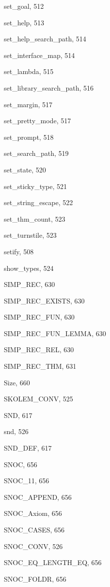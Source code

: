 \begin{theindex}
  \item {\ptt set\_goal}, 512
  \item {\ptt set\_help}, 513
  \item {\ptt set\_help\_search\_path}, 514
  \item {\ptt set\_interface\_map}, 514
  \item {\ptt set\_lambda}, 515
  \item {\ptt set\_library\_search\_path}, 516
  \item {\ptt set\_margin}, 517
  \item {\ptt set\_pretty\_mode}, 517
  \item {\ptt set\_prompt}, 518
  \item {\ptt set\_search\_path}, 519
  \item {\ptt set\_state}, 520
  \item {\ptt set\_sticky\_type}, 521
  \item {\ptt set\_string\_escape}, 522
  \item {\ptt set\_thm\_count}, 523
  \item {\ptt set\_turnstile}, 523
  \item {\ptt setify}, 508
  \item {\ptt show\_types}, 524
  \item {\ptt SIMP\_REC}, 630
  \item {\ptt SIMP\_REC\_EXISTS}, 630
  \item {\ptt SIMP\_REC\_FUN}, 630
  \item {\ptt SIMP\_REC\_FUN\_LEMMA}, 630
  \item {\ptt SIMP\_REC\_REL}, 630
  \item {\ptt SIMP\_REC\_THM}, 631
  \item {\ptt Size}, 660
  \item {\ptt SKOLEM\_CONV}, 525
  \item {\ptt SND}, 617
  \item {\ptt snd}, 526
  \item {\ptt SND\_DEF}, 617
  \item {\ptt SNOC}, 656
  \item {\ptt SNOC\_11}, 656
  \item {\ptt SNOC\_APPEND}, 656
  \item {\ptt SNOC\_Axiom}, 656
  \item {\ptt SNOC\_CASES}, 656
  \item {\ptt SNOC\_CONV}, 526
  \item {\ptt SNOC\_EQ\_LENGTH\_EQ}, 656
  \item {\ptt SNOC\_FOLDR}, 656

\end{theindex}
